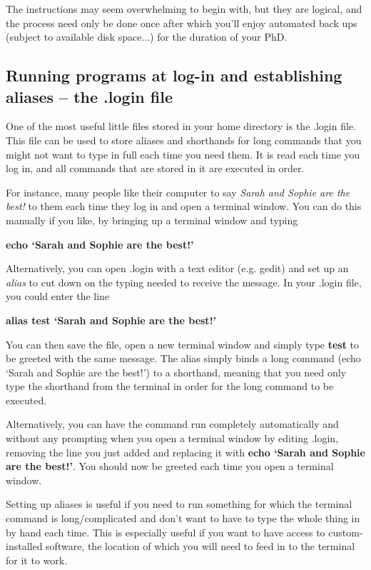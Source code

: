 The instructions may seem overwhelming to begin with, but they are logical, and the process need only be done once after which you'll enjoy automated back ups (subject to available disk space...) for the duration of your PhD.

\subsection{Running programs at log-in and establishing aliases -- the .login file}
One of the most useful little files stored in your home directory is the .login file. This file can be used to store aliases and shorthands for long commands that you might not want to type in full each time you need them. It is read each time you log in, and all commands that are stored in it are executed in order.

For instance, many people like their computer to say \textit{Sarah and Sophie are the best!} to them each time they log in and open a terminal window. You can do this manually if you like, by bringing up a terminal window and typing 

{\bf echo `Sarah and Sophie are the best!'}

Alternatively, you can open .login with a text editor (e.g. {\sc gedit}) and set up an \textit{alias} to cut down on the typing needed to receive the message. In your .login file, you could enter the line

{\bf alias test `Sarah and Sophie are the best!'}

You can then save the file, open a new terminal window and simply type {\bf test} to be greeted with the same message. The alias simply binds a long command (echo `Sarah and Sophie are the best!') to a shorthand, meaning that you need only type the shorthand from the terminal in order for the long command to be executed.

Alternatively, you can have the command run completely automatically and without any prompting when you open a terminal window by editing .login, removing the line you just added and replacing it with {\bf echo `Sarah and Sophie are the best!'}. You should now be greeted each time you open a terminal window.

Setting up aliases is useful if you need to run something for which the terminal command is long/complicated and don't want to have to type the whole thing in by hand each time. This is especially useful if you want to have access to custom-installed software, the location of which you will need to feed in to the terminal for it to work.

